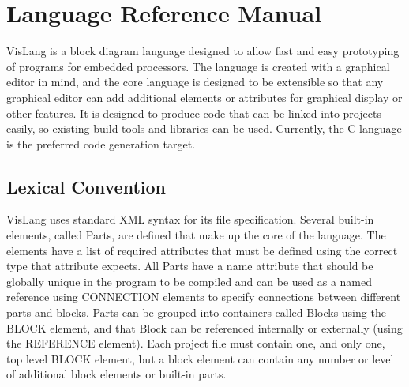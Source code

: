 \section{Language Reference Manual}
VisLang is a block diagram language designed to allow fast and easy prototyping of programs for embedded processors.
The language is created with a graphical editor in mind, and the core language is designed to be extensible so that any graphical editor can add additional elements or attributes for graphical display or other features.
It is designed to produce code that can be linked into projects easily, so existing build tools and libraries can be used.
Currently, the C language is the preferred code generation target.
\subsection{Lexical Convention}
VisLang uses standard XML syntax for its file specification.
Several built-in elements, called Parts, are defined that make up the core of the language.
The elements have a list of required attributes that must be defined using the correct type that attribute expects.
 All Parts have a name attribute that should be globally unique in the program to be compiled and can be used as a named reference using CONNECTION elements to specify connections between different parts and blocks.
Parts can be grouped into containers called Blocks using the BLOCK element, and that Block can be referenced internally or externally (using the REFERENCE element).
Each project file must contain one, and only one, top level BLOCK element, but a block element can contain any number or level of additional block elements or built-in parts.
